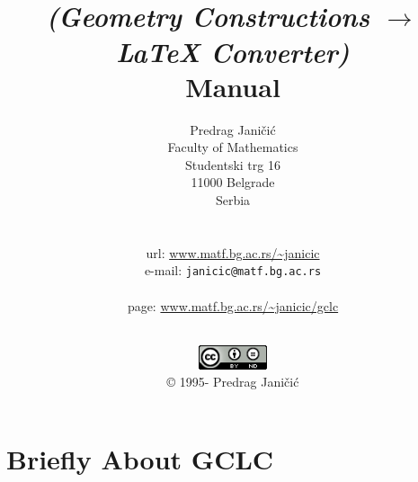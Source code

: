 \documentclass[a4paper]{book}
\title{\gclc \number \year{} \\ {\it (Geometry Constructions $\rightarrow$ \LaTeX{} Converter)} \\ 
{\bf Manual}}
\author{Predrag Jani\v{c}i\'c \\
Faculty of Mathematics \\
Studentski trg 16 \\
11000 Belgrade \\
Serbia \\ \\ \\
{\sc url}:  \url{www.matf.bg.ac.rs/~janicic} \\
e-mail:  {\tt janicic@matf.bg.ac.rs} \\ \\
\gclc page:  \url{www.matf.bg.ac.rs/~janicic/gclc}}
\date{\todayMonth{} \number \year \\ \vspace*{7cm}
\includegraphics[width=0.15\textwidth]{figures/CC-BY-ND.png} \\ 
\copyright{} 1995-\number \year {} Predrag Jani\v{c}i\'c}
\newcommand{\gclc}{{\bfseries GCLC}\xspace}
\begin{document}
\maketitle

\tableofcontents

\pagestyle{fancyplain}
\renewcommand{\chaptermark}[1]{\markboth{\thechapter\ #1}{#1}}
\renewcommand{\sectionmark}[1]{\markright{\thesection\ #1}}
\lhead[\fancyplain{}{\bfseries\slshape\thepage}]{\fancyplain{}{\bfseries\slshape\rightmark}}
\rhead[\fancyplain{}{\bfseries\slshape\leftmark}]{\fancyplain{}{\bfseries\slshape\thepage}}
\cfoot{}


\chapter{Briefly About \gclc}
\end{document}
